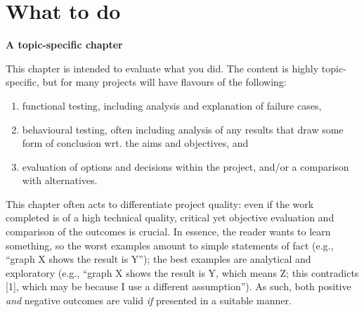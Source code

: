 \section{What to do}

{\bf A topic-specific chapter} 
\vspace{1cm} 

\noindent
This chapter is intended to evaluate what you did.  The content is highly 
topic-specific, but for many projects will have flavours of the following:

\begin{enumerate}
\item functional  testing, including analysis and explanation of failure 
      cases,
\item behavioural testing, often including analysis of any results that 
      draw some form of conclusion wrt. the aims and objectives,
      and
\item evaluation of options and decisions within the project, and/or a
      comparison with alternatives.
\end{enumerate}

\noindent
This chapter often acts to differentiate project quality: even if the work
completed is of a high technical quality, critical yet objective evaluation 
and comparison of the outcomes is crucial.  In essence, the reader wants to
learn something, so the worst examples amount to simple statements of fact 
(e.g., ``graph X shows the result is Y''); the best examples are analytical 
and exploratory (e.g., ``graph X shows the result is Y, which means Z; this 
contradicts [1], which may be because I use a different assumption'').  As 
such, both positive {\em and} negative outcomes are valid {\em if} presented 
in a suitable manner.

